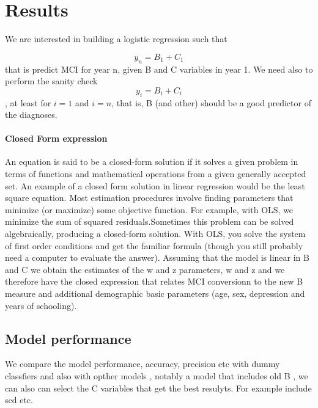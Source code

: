 \documentclass[11pt]{article}
\begin{document}
\section{Results}
We are interested in building a logistic regression such that

\[y_n = B_1 + C_1\] that is predict MCI for year n, given B and C variables in year 1. We need also to perform the sanity check \[ y_i = B_i + C_i\], at least for $i=1$ and $i=n$, that is, B (and other) should be a good predictor of the diagnoses.

\paragraph*{Closed Form expression}
An equation is said to be a closed-form solution if it solves a given problem in terms of functions and mathematical operations from a given generally accepted set.  An example of a closed form solution in linear regression would be the least square equation.
Most estimation procedures involve finding parameters that minimize (or maximize) some objective function. For example, with OLS, we minimize the sum of squared residuals.Sometimes this problem can be solved algebraically, producing a closed-form solution. With OLS, you solve the system of first order conditions and get the familiar formula (though you still probably need a computer to evaluate the answer).
Assuming that the model is linear in B and C we obtain the estimates of the w and z parameters, w and z and we therefore have the closed expression that relates MCI conversionn to the new B measure and additional demographic basic parameters (age, sex, depression and years of schooling).

\subsection*{Model performance}
We compare the model performance, accuracy, precision  etc with dummy classfiers and also with opther models , notably a model that includes old B , we can also can select the C variables that get the best resulyts. For example include scd etc.
\end{document}
